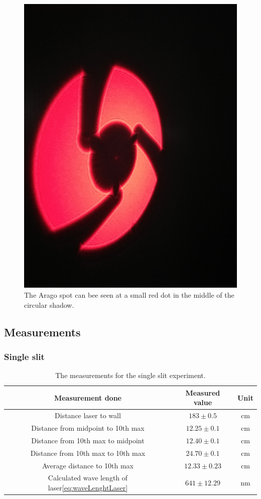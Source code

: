 \documentclass{emulateapj}
\begin{document}
\begin{figure}[H]
\centering
\includegraphics[scale=0.03]{IMG_20170828_140302.jpg}
\caption{The Arago spot can bee seen at a small red dot in the middle of the circular shadow.}
\end{figure} 

\subsection{Measurements}
\subsubsection{Single slit}

\begin{table}[H]
\begin{tabular}{ c c c }
Measurement done & Measured value & Unit\\
\hline
Distance laser to wall & $183 \pm 0.5$ & cm \\
Distance from midpoint to 10th max & $12.25 \pm 0.1$ & cm\\
Distance from 10th max to midpoint & $12.40 \pm 0.1$ & cm\\
Distance from 10th max to 10th max & $24.70 \pm 0.1$ & cm\\
Average distance to 10th max & $12.33 \pm 0.23$ & cm\\
Calculated wave length of laser\eqref{eq:waveLenghtLaser} & $641 \pm 12.29$ &nm 
\end{tabular}
\caption{The measurements for the single slit experiment.}
\end{table}\label{tab:dataSingleSlit}
\end{document}
